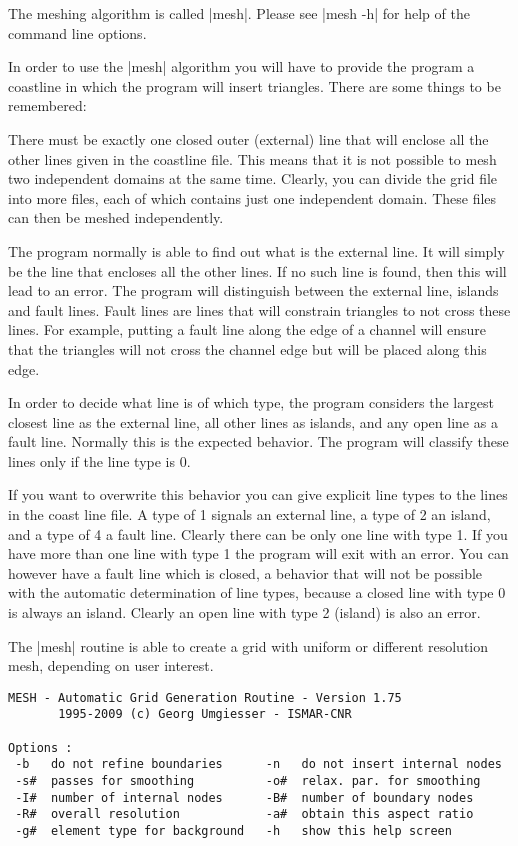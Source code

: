 The meshing algorithm is called |mesh|. Please see |mesh -h| for
help of the command line options. 

In order to use the |mesh| algorithm you will have to provide the program
a coastline in which the program will insert triangles. There are some
things to be remembered:

There must be exactly one closed outer (external) line that will enclose
all the other lines given in the coastline file. This means that it is
not possible to mesh two independent domains at the same time. Clearly,
you can divide the grid file into more files, each of which contains
just one independent domain. These files can then be meshed independently.

The program normally is able to find out what is the external line. It
will simply be the line that encloses all the other lines. If no such line
is found, then this will lead to an error. The program will distinguish
between the external line, islands and fault lines. Fault lines are lines
that will constrain triangles to not cross these lines. For example,
putting a fault line along the edge of a channel will ensure that the
triangles will not cross the channel edge but will be placed along
this edge.

In order to decide what line is of which type, the program considers the
largest closest line as the external line, all other lines as islands, and
any open line as a fault line. Normally this is the expected behavior. The
program will classify these lines only if the line type is 0.

If you want to overwrite this behavior you can give explicit line types to
the lines in the coast line file. A type of 1 signals an external line,
a type of 2 an island, and a type of 4 a fault line. Clearly there can
be only one line with type 1. If you have more than one line with type
1 the program will exit with an error. You can however have a fault line
which is closed, a behavior that will not be possible with the automatic
determination of line types, because a closed line with type 0 is always
an island. Clearly an open line with type 2 (island) is also an error.


The |mesh| routine is able to create a grid with uniform or  
different resolution mesh, depending on user interest.

\begin{verbatim}
MESH - Automatic Grid Generation Routine - Version 1.75 
       1995-2009 (c) Georg Umgiesser - ISMAR-CNR        

Options :
 -b   do not refine boundaries      -n   do not insert internal nodes
 -s#  passes for smoothing          -o#  relax. par. for smoothing   
 -I#  number of internal nodes      -B#  number of boundary nodes    
 -R#  overall resolution            -a#  obtain this aspect ratio    
 -g#  element type for background   -h   show this help screen  
\end{verbatim}


